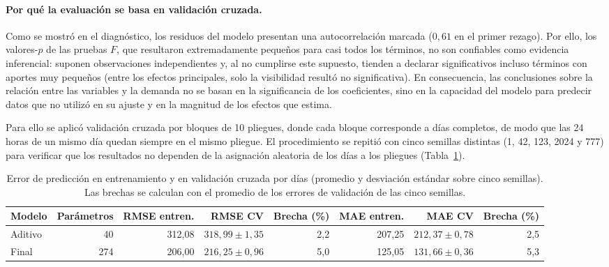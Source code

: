 \documentclass[12pt, a4paper]{article}
\numberwithin{equation}{section}
\begin{document}
\paragraph{Por qué la evaluación se basa en validación cruzada.}
Como se mostró en el diagnóstico, los residuos del modelo presentan una autocorrelación marcada ($0{,}61$ en el primer rezago). Por ello, los valores-$p$ de las pruebas $F$, que resultaron extremadamente pequeños para casi todos los términos, no son confiables como evidencia inferencial: suponen observaciones independientes y, al no cumplirse este supuesto, tienden a declarar significativos incluso términos con aportes muy pequeños (entre los efectos principales, solo la visibilidad resultó no significativa). En consecuencia, las conclusiones sobre la relación entre las variables y la demanda no se basan en la significancia de los coeficientes, sino en la capacidad del modelo para predecir datos que no utilizó en su ajuste y en la magnitud de los efectos que estima.

Para ello se aplicó validación cruzada por bloques de 10 pliegues, donde cada bloque corresponde a días completos, de modo que las 24 horas de un mismo día quedan siempre en el mismo pliegue. El procedimiento se repitió con cinco semillas distintas (1, 42, 123, 2024 y 777) para verificar que los resultados no dependen de la asignación aleatoria de los días a los pliegues (Tabla~\ref{tab:conclusion_cv}).

\begin{table}[htbp]
\centering\small
\caption{Error de predicción en entrenamiento y en validación cruzada por días (promedio y desviación estándar sobre cinco semillas). Las brechas se calculan con el promedio de los errores de validación de las cinco semillas.}
\label{tab:conclusion_cv}
\begin{adjustbox}{max width=\linewidth}
\begin{tabular}{lrrrrrrr}\toprule
Modelo & Parámetros & RMSE entren. & RMSE CV & Brecha (\%) & MAE entren. & MAE CV & Brecha (\%) \\\midrule
Aditivo & 40 & 312{,}08 & $318{,}99 \pm 1{,}35$ & 2{,}2 & 207{,}25 & $212{,}37 \pm 0{,}78$ & 2{,}5 \\
Final & 274 & 206{,}00 & $216{,}25 \pm 0{,}96$ & 5{,}0 & 125{,}05 & $131{,}66 \pm 0{,}36$ & 5{,}3 \\\bottomrule
\end{tabular}
\end{adjustbox}
\end{table}
\end{document}
